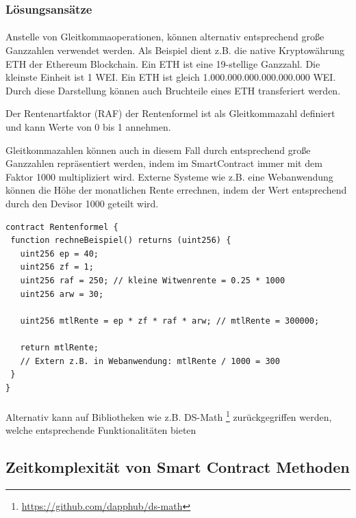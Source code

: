 \subsubsection*{Lösungsansätze}

\paragraph*{}
Anstelle von Gleitkommaoperationen, können alternativ entsprechend große Ganzzahlen verwendet werden. Als Beispiel dient z.B. die native Kryptowährung ETH der Ethereum Blockchain. Ein ETH ist eine 19-stellige Ganzzahl. Die kleinste Einheit ist 1 WEI. Ein ETH ist gleich 1.000.000.000.000.000.000 WEI. Durch diese Darstellung können auch Bruchteile eines ETH transferiert werden.

Der Rentenartfaktor (RAF) der Rentenformel ist als Gleitkommazahl definiert und kann Werte von 0 bis 1 annehmen. \cite{raf}

Gleitkommazahlen können auch in diesem Fall durch entsprechend große Ganzzahlen repräsentiert werden, indem im SmartContract immer mit dem Faktor 1000 multipliziert wird. Externe Systeme wie z.B. eine Webanwendung können die Höhe der monatlichen Rente errechnen, indem der Wert entsprechend durch den Devisor 1000 geteilt wird.

\begin{lstlisting}[caption={Verzicht von Gleitkommazahlen durch Multiplikation},captionpos=b,label=lst:simfloat]
contract Rentenformel {
 function rechneBeispiel() returns (uint256) {
   uint256 ep = 40;
   uint256 zf = 1;
   uint256 raf = 250; // kleine Witwenrente = 0.25 * 1000
   uint256 arw = 30;
   
   uint256 mtlRente = ep * zf * raf * arw; // mtlRente = 300000;
   
   return mtlRente; 
   // Extern z.B. in Webanwendung: mtlRente / 1000 = 300
 }
}
\end{lstlisting}

\paragraph*{}
Alternativ kann auf Bibliotheken wie z.B. DS-Math \footnote{\url{https://github.com/dapphub/ds-math}} zurückgegriffen werden, welche entsprechende Funktionalitäten bieten


\subsection{Zeitkomplexität von Smart Contract Methoden}

